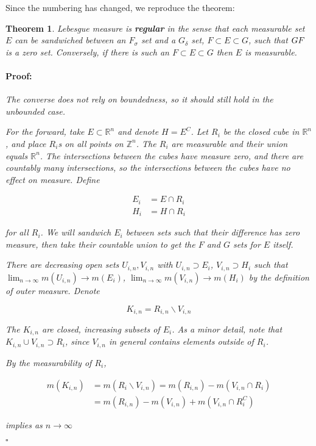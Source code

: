 \documentclass{article}
\newenvironment{proof}{\paragraph{Proof:}}{\hfill$\square$}
\newtheorem{theorem}{Theorem}
\newcommand{\R}{\mathbb{R}}
\newcommand{\Z}{\mathbb{Z}}
\begin{document}
Since the numbering has changed, we reproduce the theorem:

\begin{theorem}
Lebesgue measure is \textbf{regular} in the sense that each measurable set $E$ can be sandwiched between an $F_\sigma$ set and a $G_\delta$ set, $F \subset E \subset G$, such that $G \\ F$ is a zero set. Conversely, if there is such an $F \subset E \subset G$ then $E$ is measurable.

\begin{proof}
The converse does not rely on boundedness, so it should still hold in the unbounded case.

For the forward, take $E \subset \R^n$ and denote $H = E^C$. Let $R_i$ be the closed cube in $\R^n$, and place $R_i$s on all points on $\Z^n$. The $R_i$ are measurable and their union equals $\R^n$. The intersections between the cubes have measure zero, and there are countably many intersections, so the intersections between the cubes have no effect on measure. Define

\begin{align*}
E_i &= E \cap R_i \\
H_i &= H \cap R_i
\end{align*}

for all $R_i$. We will sandwich $E_i$ between sets such that their difference has zero measure, then take their countable union to get the $F$ and $G$ sets for $E$ itself.

There are decreasing open sets $U_{i, n}, V_{i, n}$ with $U_{i, n} \supset E_i$, $V_{i, n} \supset H_i$ such that $\lim_{n \rightarrow \infty} m(U_{i,n}) \rightarrow m(E_i)$, $\lim_{n \rightarrow \infty} m(V_{i,n}) \rightarrow m(H_i)$ by the definition of outer measure. Denote 

\[
K_{i, n} = R_{i,n} \backslash V_{i, n}
\]

The $K_{i,n}$ are closed, increasing subsets of $E_i$. As a minor detail, note that $K_{i,n} \cup V_{i,n} \supset R_i$, since $V_{i,n}$ in general contains elements outside of $R_i$.

By the measurability of $R_i$,

\begin{align*}
m(K_{i,n}) &= m(R_i \backslash V_{i,n}) = m(R_{i,n}) - m(V_{i,n} \cap R_i) \\
&= m(R_{i,n}) - m(V_{i,n}) + m(V_{i,n} \cap R_i^C)
\end{align*}

implies as $n \rightarrow \infty$


\end{proof}
\end{theorem}
\end{document}
